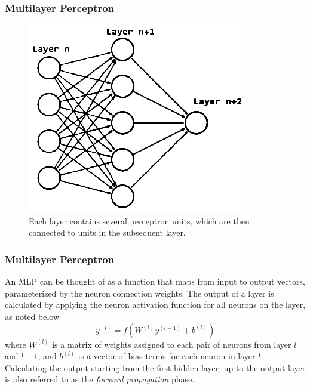 \documentclass{beamer}
\begin{document}
\begin{frame}
\frametitle{Multilayer Perceptron}
\begin{figure}[!htb]
\centering
\includegraphics[height=0.7\textheight]{mlp}
\caption{Each layer contains several perceptron units, which are then connected to units in the subsequent layer.}
\label{mlp}
\end{figure}
\end{frame}

\begin{frame}
\frametitle{Multilayer Perceptron}
An MLP can be thought of as a function that maps from input to output vectors, parameterized by the neuron connection weights. The output of a layer
is calculated by applying the neuron activation function for all neurons on the layer, as
noted below
\begin{equation}
y^{(l)} = f(W^{(l)} y^{(l-1)} + b^{(l)})
\label{eq:outputmlp}
\end{equation}
where $W^{(l)}$ is a matrix of weights assigned to each pair of neurons from layer $l$ and $l-1$, and $b^{(l)}$ is a vector of bias terms for each neuron in layer $l$. Calculating the output starting from the first hidden layer, up to the output layer is also referred to as the \textit{forward propagation} phase.
\end{frame}
\end{document}
